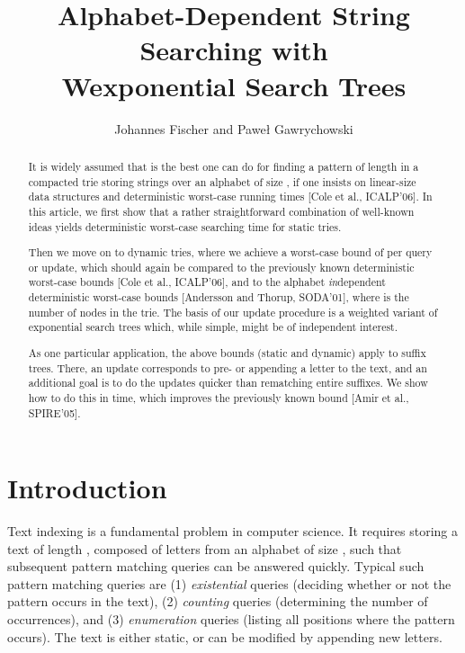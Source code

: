 \documentclass[11pt,onecolumn,final]{article} \usepackage{a4}
\title{Alphabet-Dependent String Searching with \\Wexponential Search Trees}
\author{Johannes Fischer and Pawe{\l} Gawrychowski}
\theoremstyle{plain}
\theoremstyle{remark}
\begin{document}
\maketitle

\begin{abstract}
It is widely assumed that  is the best one can do for finding a pattern of length  in a compacted trie storing strings over an alphabet of size , if one insists on linear-size data structures and deterministic worst-case running times [Cole et al., ICALP'06]. In this article, we first show that a rather straightforward combination of well-known ideas yields  deterministic worst-case searching time for static tries.


Then we move on to dynamic tries, where we achieve a worst-case bound of  per query or update, which should again be compared to the previously known  deterministic worst-case bounds [Cole et al., ICALP'06], and to the alphabet \emph{in}dependent  deterministic worst-case bounds [Andersson and Thorup, SODA'01], where  is the number of nodes in the trie. The basis of our update procedure is a weighted variant of exponential search trees which, while simple, might be of independent interest.

As one particular application, the above bounds (static and dynamic) apply to suffix trees. There, an update corresponds to pre- or appending a letter to the text, and an additional goal is to do the updates quicker than rematching entire suffixes. We show how to do this in  time, which improves the previously known  bound [Amir et al., SPIRE'05].
\end{abstract}

\section{Introduction}
Text indexing is a fundamental problem in computer science. It requires storing a text of length , composed of letters from an alphabet of size , such that subsequent pattern matching queries can be answered quickly. Typical such pattern matching queries are (1) \emph{existential} queries (deciding whether or not the pattern occurs in the text), (2) \emph{counting} queries (determining the number of occurrences), and (3) \emph{enumeration} queries (listing all positions where the pattern occurs). The text is either static, or can be modified by appending new letters.
\end{document}
